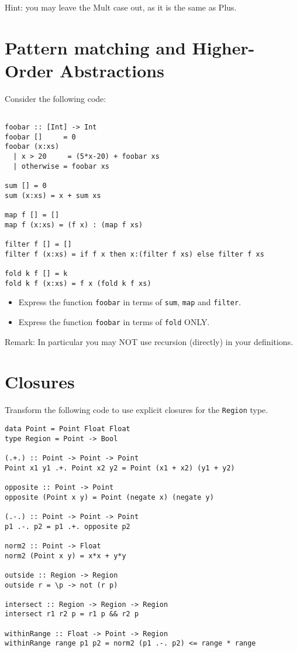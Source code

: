\documentclass{article}
\newcommand{\answer}[1]{}
\begin{document}
Hint: you may leave the Mult case out, as it is the same as Plus.

\newpage
\section{Pattern matching and Higher-Order Abstractions}

Consider the following code:
\begin{verbatim}

foobar :: [Int] -> Int
foobar []     = 0
foobar (x:xs)
  | x > 20     = (5*x-20) + foobar xs
  | otherwise = foobar xs

sum [] = 0
sum (x:xs) = x + sum xs

map f [] = []
map f (x:xs) = (f x) : (map f xs)

filter f [] = []
filter f (x:xs) = if f x then x:(filter f xs) else filter f xs

fold k f [] = k
fold k f (x:xs) = f x (fold k f xs)
\end{verbatim}

\begin{itemize}
  \item Express the function \texttt{foobar} in terms of \texttt{sum}, \texttt{map} and \texttt{filter}.
  \item Express the function \texttt{foobar} in terms of \texttt{fold} ONLY.
\end{itemize}

Remark: In particular you may NOT use recursion (directly) in your definitions.

\answer{
  \begin{verbatim}
  foobar = sum . map (\x -> 7*x+2) . filter (>3)
  foobar = fold 0 f where
     f x acc = if x > 3 then 7*x + 2 + acc else acc
   \end{verbatim}
}

\newpage
\section{Closures}

Transform the following code to use explicit closures for the
\texttt{Region} type.

\begin{verbatim}
data Point = Point Float Float
type Region = Point -> Bool

(.+.) :: Point -> Point -> Point
Point x1 y1 .+. Point x2 y2 = Point (x1 + x2) (y1 + y2)

opposite :: Point -> Point
opposite (Point x y) = Point (negate x) (negate y)

(.-.) :: Point -> Point -> Point
p1 .-. p2 = p1 .+. opposite p2

norm2 :: Point -> Float
norm2 (Point x y) = x*x + y*y

outside :: Region -> Region
outside r = \p -> not (r p)

intersect :: Region -> Region -> Region
intersect r1 r2 p = r1 p && r2 p

withinRange :: Float -> Point -> Region
withinRange range p1 p2 = norm2 (p1 .-. p2) <= range * range
\end{verbatim}
\end{document}
